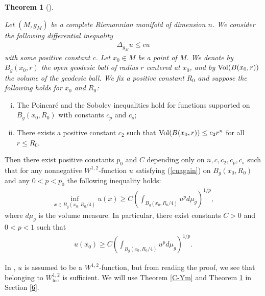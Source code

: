 \documentclass[12pt]{article}
\theoremstyle{definition}
\newtheorem{theo}[defi]{Theorem}
\def\Vol{{\rm Vol}}
\begin{document}
\begin{theo}[\cite{CT1}]\label{MVI}{\it Let $(M,g_M)$ be a complete Riemannian manifold of dimension $n$. We consider the following differential inequality 
\begin{align}
\Delta_{g_M}u\leq c u \label{cuagain}
\end{align}
with some positive constant $c$. Let $x_0\in M$ be a point of $M$. We denote by $B_g(x_0,r)$ the open geodesic ball of radius $r$ centered at $x_0$, and by $\Vol(B(x_0, r))$ the volume of the geodesic ball. We fix a positive constant $R_0$ and suppose the following holds for $x_0$ and $R_0$:
\begin{enumerate}[(i)]
\item The Poincar\'e and the Sobolev inequalities hold for functions supported on $B_g(x_0, R_0)$ with constants $c_p$ and $c_s$;
\item There exists a positive constant $c_2$ such that $\Vol(B(x_0,r))\leq c_2r^n$ for all $r\leq R_0$.
\end{enumerate}
Then there exist positive constants $p_0$ and $C$ depending only on $n, c, c_2, c_p, c_s$ such that for any nonnegative $W^{1,2}$-function $u$ satisfying (\ref{cuagain}) on $B_g(x_0, R_0)$ and any $0<p<p_0$ the following inequality holds:
\begin{align*}
\inf_{x\in B_g(x_0,R_0/4)} u(x)\geq C\left(\int_{B_g(x_0,R_0/4)}u^pd\mu_g\right)^{1/p},
\end{align*}
where $d\mu_g$ is the volume measure. In particular, there exist constants $C>0$ and $0<p<1$ such that 
\begin{align*}
u(x_0)\geq C\left(\int_{B_g(x_0,R_0/4)}u^pd\mu_g\right)^{1/p}.
\end{align*}
}
\end{theo}
In \cite{CT1}, $u$ is assumed to be a $W^{1,2}$-function, but from reading the proof, we see that belonging to $W^{1,2}_{\mathrm{loc}}$ is sufficient. We will use Theorem \ref{C-Ym} and Theorem \ref{MVI} in Section \ref{6}. 
\end{document}
